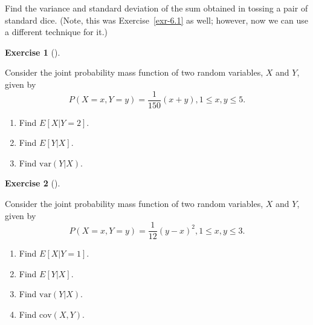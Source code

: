 \documentclass[
  letterpaper,
  DIV=11,
  numbers=noendperiod]{scrreprt}
\providecommand{\tightlist}{%
  \setlength{\itemsep}{0pt}\setlength{\parskip}{0pt}}\usepackage{longtable,booktabs,array}
\theoremstyle{definition}
\newtheorem{exercise}{Exercise}[chapter]
\theoremstyle{definition}
\theoremstyle{definition}
\theoremstyle{remark}
\begin{document}

Find the variance and standard deviation of the sum obtained in tossing
a pair of standard dice. (Note, this was Exercise~\ref{exr-6.1} as well;
however, now we can use a different technique for it.)

\begin{exercise}[]\protect\hypertarget{exr-7.2}{}\label{exr-7.2}

Consider the joint probability mass function of two random variables,
\(X\) and \(Y\), given by
\[P(X=x, Y=y) = \frac{1}{150}(x + y), 1\leq x, y\leq 5.\]

\begin{enumerate}
\def\labelenumi{\alph{enumi}.}
\tightlist
\item
  Find \(E[X|Y=2]\).
\item
  Find \(E[Y|X]\).
\item
  Find \(\text{var}(Y|X)\).
\end{enumerate}

\end{exercise}

\begin{exercise}[]\protect\hypertarget{exr-7.3}{}\label{exr-7.3}

Consider the joint probability mass function of two random variables,
\(X\) and \(Y\), given by
\[P(X=x, Y=y) = \frac{1}{12}(y - x)^2, 1\leq x, y\leq 3.\]

\begin{enumerate}
\def\labelenumi{\alph{enumi}.}
\tightlist
\item
  Find \(E[X|Y=1]\).
\item
  Find \(E[Y|X]\).
\item
  Find \(\text{var}(Y|X)\).
\item
  Find \(\text{cov}(X,Y)\).
\end{enumerate}

\end{exercise}
\end{document}
